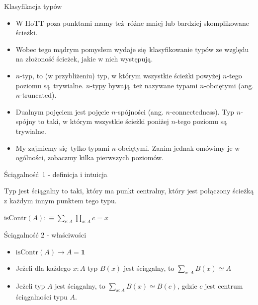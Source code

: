 \documentclass{beamer}
\newcommand{\defn}{:\equiv}
\newcommand{\isContr}{\text{isContr}}
\begin{document}
\begin{frame}{Klasyfikacja typów}
\begin{itemize}
	\item W HoTT poza punktami mamy też różne mniej lub bardziej skomplikowane ścieżki.
	\item Wobec tego mądrym pomysłem wydaje się klasyfikowanie typów ze względu na złożoność ścieżek, jakie w nich występują.
	\item $n$-typ, to (w przybliżeniu) typ, w którym wszystkie ścieżki powyżej $n$-tego poziomu są trywialne. $n$-typy bywają też nazywane typami $n$-obciętymi (ang. $n$-truncated).
	\item Dualnym pojęciem jest pojęcie $n$-spójności (ang. $n$-connectedness). Typ $n$-spójny to taki, w którym wszystkie ścieżki poniżej $n$-tego poziomu są trywialne.
	\item My zajmiemy się tylko typami $n$-obciętymi. Zanim jednak omówimy je w ogólności, zobaczmy kilka pierwszych poziomów.
\end{itemize}
\end{frame}

\begin{frame}{Ściągalność 1 - definicja i intuicja}

Typ jest ściągalny to taki, który ma punkt centralny, który jest połączony ścieżką z każdym innym punktem tego typu.

\begin{definition}[Ściągalność]
$
\displaystyle
\isContr(A) \defn \sum_{c : A} \prod_{x : A} c = x
$
\end{definition}

\end{frame}

\begin{frame}{Ściągalność 2 - właściwości}
\begin{itemize}
	\item $\isContr(A) \to A = \mathbf{1}$
	\item Jeżeli dla każdego $x : A$ typ $B(x)$ jest ściągalny, to $\sum_{x : A} B(x) \simeq A$
	\item Jeżeli typ $A$ jest ściągalny, to $\sum_{x : A} B(x) \simeq B(c)$, gdzie $c$ jest centrum ściągalności typu $A$.
\end{itemize}
\end{frame}
\end{document}

